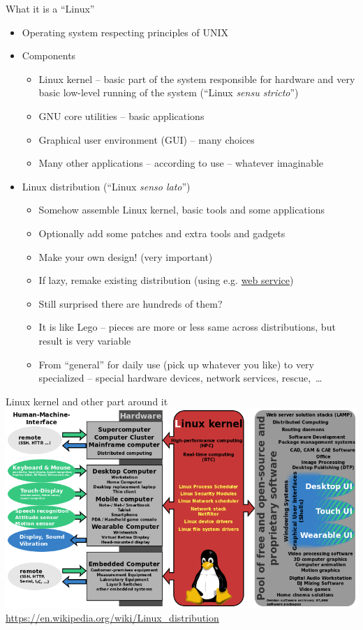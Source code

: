 \documentclass[compress, ucs, xelatex, 11pt, xcolor=svgnames,
  hyperref={
    bookmarks=true,
    unicode=true,
    colorlinks=true,
    pdftitle={Linux, command line and MetaCentrum},
    plainpages=false,
    pdfauthor={Vojtech Zeisek},
    pdfsubject={Course about use of Linux command line, writing shell scripts and using MetaCentrum of CESNET},
    pdfcreator={XeLaTeX},
    pdfkeywords={Linux, GNU, BASH, shell, command line, MetaCentrum},
    linkcolor=DarkRed,
    anchorcolor=DarkBlue,
    citecolor=Indigo,
    filecolor=NavyBlue,
    menucolor=DarkMagenta,
    urlcolor=DarkBlue,
    pdftex},
  url={hyphens, lowtilde} %
  ]{beamer}
\begin{document}
\begin{frame}{What it is a ``Linux''}
  \begin{itemize}
    \item Operating system respecting principles of UNIX
    \item Components
    \begin{itemize}
      \item Linux kernel -- basic part of the system responsible for hardware and very basic low-level running of the system (``Linux \textit{sensu stricto}'')
      \item GNU core utilities -- basic applications
      \item Graphical user environment (GUI) -- many choices
      \item Many other applications -- according to use -- whatever imaginable
    \end{itemize}
    \item Linux distribution (``Linux \textit{senso lato}'')
    \begin{itemize}
      \item Somehow assemble Linux kernel, basic tools and some applications
      \item Optionally add some patches and extra tools and gadgets
      \item Make your own design! (very important)
      \item If lazy, remake existing distribution (using e.g. \href{https://susestudio.com/}{web service})
      \item Still surprised there are hundreds of them?
      \item It is like Lego -- pieces are more or less same across distributions, but result is very variable
      \item From ``general'' for daily use (pick up whatever you like) to very specialized -- special hardware devices, network services, rescue,~\ldots
    \end{itemize}
  \end{itemize}
\end{frame}

\begin{frame}{Linux kernel and other part around it}
  \includegraphics[width=\textwidth]{linux_kernel_ubiquity.png}
  \vfil
  \url{https://en.wikipedia.org/wiki/Linux_distribution}
  \vfill
\end{frame}
\end{document}
